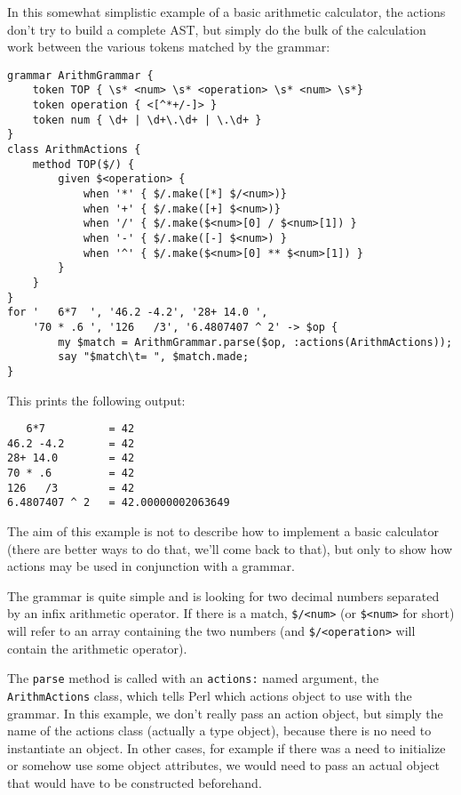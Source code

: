 In this somewhat simplistic example of a basic arithmetic  
calculator, the actions don't try to build a complete AST, but simply 
do the bulk of the calculation work between the various tokens
matched by the grammar:

\begin{verbatim}
grammar ArithmGrammar {
    token TOP { \s* <num> \s* <operation> \s* <num> \s*}
    token operation { <[^*+/-]> }
    token num { \d+ | \d+\.\d+ | \.\d+ }
}
class ArithmActions {
    method TOP($/) {
        given $<operation> {
            when '*' { $/.make([*] $/<num>)}
            when '+' { $/.make([+] $<num>)}
            when '/' { $/.make($<num>[0] / $<num>[1]) }
            when '-' { $/.make([-] $<num>) }
            when '^' { $/.make($<num>[0] ** $<num>[1]) }
        }
    }
}
for '   6*7  ', '46.2 -4.2', '28+ 14.0 ',
    '70 * .6 ', '126   /3', '6.4807407 ^ 2' -> $op {
        my $match = ArithmGrammar.parse($op, :actions(ArithmActions));
        say "$match\t= ", $match.made;
}
\end{verbatim}

This prints the following output:

\begin{verbatim}
   6*7          = 42
46.2 -4.2       = 42
28+ 14.0        = 42
70 * .6         = 42
126   /3        = 42
6.4807407 ^ 2   = 42.00000002063649
\end{verbatim}

The aim of this example is not to describe how to implement 
a basic calculator (there are better ways to do that, we'll 
come back to that), but only to show how actions may be 
used in conjunction with a grammar.

The grammar is quite simple and is looking for two decimal numbers 
separated by an infix arithmetic operator. If there is a 
match, \verb'$/<num>' (or \verb'$<num>' for short) will refer to an 
array containing the two numbers (and \verb'$/<operation>' 
will contain the arithmetic operator).

The {\tt parse} 
method is called with an {\tt actions:} named argument, 
the {\tt ArithmActions} class, which tells Perl which 
actions object to use with the grammar. In this example, we 
don't really pass an action object, but simply the name 
of the actions class (actually a type object), 
because there is no need to instantiate an object. In 
other cases, for example if there was a need to initialize 
or somehow use some object attributes, we would need to pass 
an actual object that would have to be constructed beforehand.


